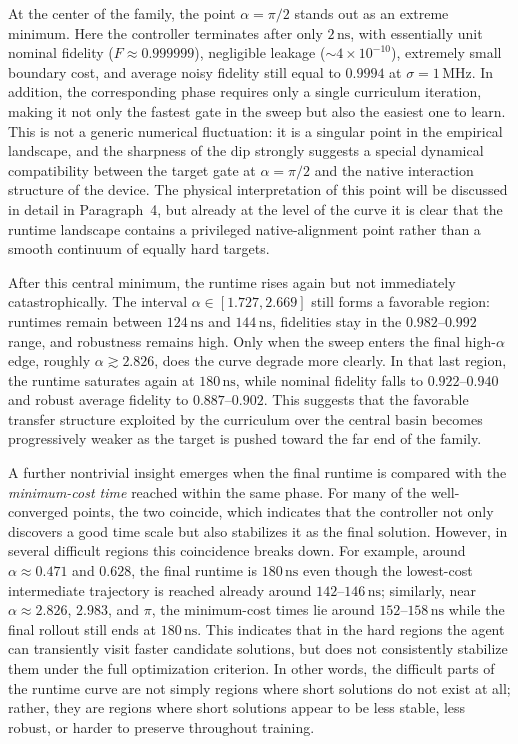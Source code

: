 At the center of the family, the point \(\alpha=\pi/2\) stands out as an extreme minimum. Here the controller
terminates after only \(2\,\mathrm{ns}\), with essentially unit nominal fidelity
(\(F \approx 0.999999\)), negligible leakage (\(\sim 4\times 10^{-10}\)), extremely small boundary cost, and
average noisy fidelity still equal to \(0.9994\) at \(\sigma=1\,\mathrm{MHz}\). In addition, the corresponding
phase requires only a single curriculum iteration, making it not only the fastest gate in the sweep but also the
easiest one to learn. This is not a generic numerical fluctuation: it is a singular point in the empirical
landscape, and the sharpness of the dip strongly suggests a special dynamical compatibility between the target gate
at \(\alpha=\pi/2\) and the native interaction structure of the device. The physical interpretation of this point
will be discussed in detail in Paragraph~4, but already at the level of the curve it is clear that the runtime
landscape contains a privileged native-alignment point rather than a smooth continuum of equally hard targets.

After this central minimum, the runtime rises again but not immediately catastrophically. The interval
\(\alpha \in [1.727,2.669]\) still forms a favorable region: runtimes remain between \(124\,\mathrm{ns}\) and
\(144\,\mathrm{ns}\), fidelities stay in the \(0.982\)--\(0.992\) range, and robustness remains high. Only when
the sweep enters the final high-\(\alpha\) edge, roughly \(\alpha \gtrsim 2.826\), does the curve degrade more
clearly. In that last region, the runtime saturates again at \(180\,\mathrm{ns}\), while nominal fidelity falls
to \(0.922\)--\(0.940\) and robust average fidelity to \(0.887\)--\(0.902\). This suggests that the favorable
transfer structure exploited by the curriculum over the central basin becomes progressively weaker as the target is
pushed toward the far end of the family.

A further nontrivial insight emerges when the final runtime is compared with the
\emph{minimum-cost time} reached within the same phase. For many of the well-converged points, the two coincide,
which indicates that the controller not only discovers a good time scale but also stabilizes it as the final
solution. However, in several difficult regions this coincidence breaks down. For example, around
\(\alpha \approx 0.471\) and \(0.628\), the final runtime is \(180\,\mathrm{ns}\) even though the lowest-cost
intermediate trajectory is reached already around \(142\)--\(146\,\mathrm{ns}\); similarly, near
\(\alpha \approx 2.826\), \(2.983\), and \(\pi\), the minimum-cost times lie around \(152\)--\(158\,\mathrm{ns}\)
while the final rollout still ends at \(180\,\mathrm{ns}\). This indicates that in the hard regions the agent can
transiently visit faster candidate solutions, but does not consistently stabilize them under the full optimization
criterion. In other words, the difficult parts of the runtime curve are not simply regions where short solutions do
not exist at all; rather, they are regions where short solutions appear to be less stable, less robust, or harder
to preserve throughout training.

